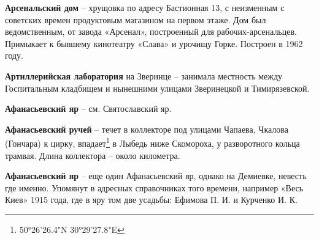 \medskip


\textbf{Арсенальский дом} – хрущовка по адресу Бастионная 13, с неизменным с советских времен продуктовым магазином на первом этаже. Дом был ведомственным, от завода «Арсенал», построенный для рабочих-арсенальцев. Примыкает к бывшему кинотеатру «Слава» и урочищу Горке. Построен в 1962 году.\\

\medskip


\textbf{Артиллерийская лаборатория} на Зверинце – занимала местность между Госпитальным кладбищем и нынешними улицами Зверинецкой и Тимирязевской.\\

\medskip


\textbf{Афанасьевский яр} – см. Святославский яр.\\

\medskip


\textbf{Афанасьевский ручей} – течет в коллекторе под улицами Чапаева, Чкалова (Гончара) к цирку, впадает\footnote{50°26'26.4"N 30°29'27.8"E} в Лыбедь ниже Скомороха, у разворотного кольца трамвая. Длина коллектора – около километра.\\

\medskip


\textbf{Афанасьевский яр} – еще один Афанасьевский яр, однако на Демиевке, невесть где именно. Упомянут в адресных справочниках того времени, например «Весь Киев» 1915 года, где в яру том две усадьбы: Ефимова П. И. и Курченко И. К.
